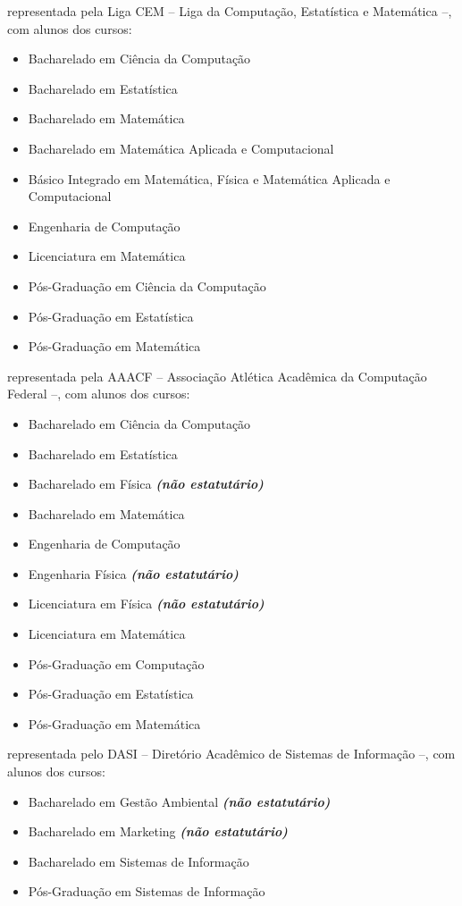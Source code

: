\begin{article}
\begin{description}[noitemsep]
		\item[UNICAMP - Campinas] representada pela Liga CEM -- Liga da Computação, Estatística e Matemática --, com alunos dos cursos:
		\begin{itemize}[noitemsep]
			\item Bacharelado em Ciência da Computação
			\item Bacharelado em Estatística
			\item Bacharelado em Matemática
			\item Bacharelado em Matemática Aplicada e Computacional
			\item Básico Integrado em Matemática, Física e Matemática Aplicada e Computacional
			\item Engenharia de Computação
			\item Licenciatura em Matemática
			\item Pós-Graduação em Ciência da Computação
			\item Pós-Graduação em Estatística
			\item Pós-Graduação em Matemática
		\end{itemize}

		\item[UFSCar - São Carlos] representada pela AAACF -- Associação Atlética Acadêmica da Computação Federal --, com alunos dos cursos:
		\begin{itemize}[noitemsep]
			\item Bacharelado em Ciência da Computação
			\item Bacharelado em Estatística
			\item Bacharelado em Física \textbf{\textit{(não estatutário)}}
			\item Bacharelado em Matemática
			\item Engenharia de Computação
			\item Engenharia Física \textbf{\textit{(não estatutário)}}
			\item Licenciatura em Física \textbf{\textit{(não estatutário)}}
			\item Licenciatura em Matemática
			\item Pós-Graduação em Computação
			\item Pós-Graduação em Estatística
			\item Pós-Graduação em Matemática
		\end{itemize}

		\item[USP Leste - EACH] representada pelo DASI -- Diretório Acadêmico de Sistemas de Informação --, com alunos dos cursos:
		\begin{itemize}[noitemsep]
			\item Bacharelado em Gestão Ambiental \textbf{\textit{(não estatutário)}}
			\item Bacharelado em Marketing \textbf{\textit{(não estatutário)}}
			\item Bacharelado em Sistemas de Informação
			\item Pós-Graduação em Sistemas de Informação
		\end{itemize}


\end{description}
\end{article}
